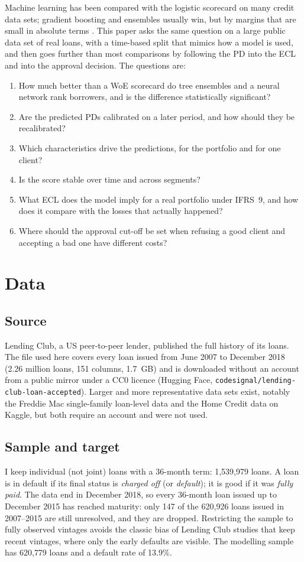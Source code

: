 \documentclass[11pt,a4paper]{article}
\begin{document}
Machine learning has been compared with the logistic scorecard on many credit data sets; gradient boosting and ensembles usually win, but by margins that are small in absolute terms \citep{lessmann2015}. This paper asks the same question on a large public data set of real loans, with a time-based split that mimics how a model is used, and then goes further than most comparisons by following the PD into the ECL and into the approval decision. The questions are:
\begin{enumerate}
  \item How much better than a WoE scorecard do tree ensembles and a neural network rank borrowers, and is the difference statistically significant?
  \item Are the predicted PDs calibrated on a later period, and how should they be recalibrated?
  \item Which characteristics drive the predictions, for the portfolio and for one client?
  \item Is the score stable over time and across segments?
  \item What ECL does the model imply for a real portfolio under IFRS~9, and how does it compare with the losses that actually happened?
  \item Where should the approval cut-off be set when refusing a good client and accepting a bad one have different costs?
\end{enumerate}

\section{Data}

\subsection{Source}
Lending Club, a US peer-to-peer lender, published the full history of its loans. The file used here covers every loan issued from June 2007 to December 2018 (2.26 million loans, 151 columns, 1.7~GB) and is downloaded without an account from a public mirror under a CC0 licence (Hugging Face, \texttt{codesignal/lending-club-loan-accepted}). Larger and more representative data sets exist, notably the Freddie Mac single-family loan-level data and the Home Credit data on Kaggle, but both require an account and were not used.

\subsection{Sample and target}
I keep individual (not joint) loans with a 36-month term: 1{,}539{,}979 loans. A loan is in default if its final status is \emph{charged off} (or \emph{default}); it is good if it was \emph{fully paid}. The data end in December 2018, so every 36-month loan issued up to December 2015 has reached maturity: only 147 of the 620{,}926 loans issued in 2007--2015 are still unresolved, and they are dropped. Restricting the sample to fully observed vintages avoids the classic bias of Lending Club studies that keep recent vintages, where only the early defaults are visible. The modelling sample has 620{,}779 loans and a default rate of 13.9\%.
\end{document}
